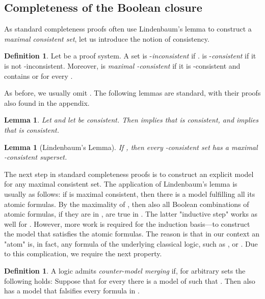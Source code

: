 \documentclass[a4paper,english,fleqn,11pt,final]{scrartcl}
\theoremstyle{plain}
\newtheorem{lemma}[theorem]{Lemma}
\theoremstyle{definition}
\newtheorem{definition}[theorem]{Definition}
\begin{document}
\subsection{Completeness of the Boolean closure}

As standard completeness proofs often use Lindenbaum's lemma to construct a \emph{maximal consistent set}, let us introduce the notion of consistency.

\begin{definition}
Let  be a proof system.
A set  is -\emph{inconsistent} if .  is -\emph{consistent} if it is not -inconsistent.
Moreover,  is \emph{maximal -consistent} if it is -consistent and contains  or  for every .
\end{definition}

As before, we usually omit .
The following lemmas are standard, with their proofs also found in the appendix.

\begin{lemma}\label{lem:only-one-consistent}
Let  and let  be consistent.
Then  implies that  is consistent, and  implies that  is consistent.
\end{lemma}

\begin{lemma}[Lindenbaum's Lemma]\label{lem:lindenbaum}
	If , then every -consistent set has a maximal -consistent superset.
\end{lemma}

The next step in standard completeness proofs is to construct an explicit model for any maximal consistent set.
The application of Lindenbaum's lemma is usually as follows:
if  is maximal consistent, then there is a model  fulfilling all its atomic formulas.
By the maximality of , then also all Boolean combinations of atomic formulas, if they are in , are true in .
The latter "inductive step" works as well for .
However, more work is required for the induction basis---to construct the model  that satisfies the atomic formulas.
The reason is that in our context an "atom" is, in fact, any formula of the underlying classical logic, such as ,  or .
Due to this complication, we require the next property.


\begin{definition}
A logic  admits \emph{counter-model merging} if, for arbitrary sets  the following holds:
Suppose that for every  there is a model  of  such that .
Then  also has a model  that falsifies every formula in .
\end{definition}
\end{document}
